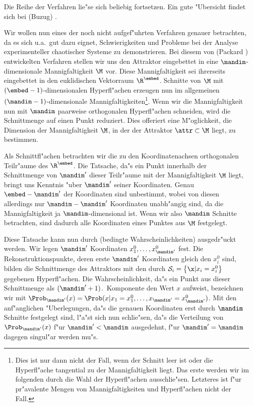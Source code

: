Die Reihe der Verfahren lie"se sich beliebig fortsetzen. Ein gute "Ubersicht
findet sich bei \autor(Buzug) \cite{Buzug94}. 

Wir wollen nun eines der noch nicht
aufgef"uhrten Verfahren genauer betrachten, da es sich u.a.\  gut dazu eignet,
Schwierigkeiten und Probleme bei der Analyse experimenteller chaotischer Systeme zu
demonstrieren. Bei diesem von \autor(Packard \etal) \cite{Packard80} entwickelten Verfahren stellen wir
uns den Attraktor eingebettet in eine $\mandim$-dimensionale Mannigfaltigkeit $\M$ vor.
Diese Mannigfaltigkeit sei ihrerseits eingebettet in den euklidischen Vektorraum
$\R^\embed$.  Schnitte von $\M$ mit $(\embed-1)$-di\-men\-sio\-nalen Hyperfl"achen
erzeugen nun im allgemeinen $(\mandim-1)$-dimensionale Mannigfaltigkeiten\footnote{Dies
  ist nur dann nicht der Fall, wenn der Schnitt leer ist oder die Hyperfl"ache tangential
  zu der Mannigfaltigkeit liegt.  Das erste werden wir im folgenden durch die Wahl der
  Hyperfl"achen ausschlie"sen. Letzteres ist f"ur pr"avalente Mengen von
  Mannigfaltigkeiten und Hyperfl"achen nicht der Fall.}.  Wenn wir die
Mannigfaltigkeit nun mit $\mandim$ paarweise orthogonalen Hyperfl"achen schneiden, wird
die Schnittmenge auf einen Punkt reduziert. Dies offeriert eine M"oglichkeit, die Dimension
der Mannigfaltigkeit $\M$, in der der Attraktor $\attr\subset\M$ liegt, zu bestimmen.

Als Schnittfl"achen betrachten wir die zu den Koordinatenachsen orthogonalen Teil\-r"aume
des $\R^\embed$. Die Tatsache, da"s ein Punkt innerhalb der Schnittmenge von $\mandim'$
dieser Teil\-r"aume mit der Mannigfaltigkeit $\M$ liegt, bringt uns Kenntnis "uber
$\mandim'$ seiner Koordinaten. Genau $\embed-\mandim'$ der Koordinaten sind unbestimmt,
wobei von diesen allerdings nur $\mandim-\mandim'$ Koordinaten unabh"angig sind, da die
Mannigfaltigkeit ja $\mandim$-dimensional ist. Wenn wir also $\mandim$ Schnitte
betrachten, sind dadurch alle Koordinaten eines Punktes aus $\M$ festgelegt.

Diese Tatsache kann nun durch \begriff(bedingte Wahrscheinlichkeiten) ausgedr"uckt werden.
Wir legen $\mandim'$ Koordinaten $x^0_1,\dots,x^0_{\mandim'}$ fest. Die
Rekonstruktionspunkte, deren erste $\mandim'$ Koordinaten gleich den $x^0_i$ sind, bilden
die Schnittmenge des Attraktors mit den durch $\mathcal{S}_i=\left\{ \x \vert
  x_i=x^0_i\right\}$ gegebenen Hyperfl"achen. Die Wahrscheinlichkeit, da"s ein Punkt aus
dieser Schnittmenge als $(\mandim'+1)$.\  Komponente den Wert $x$ aufweist, bezeichnen wir
mit $\Prob_{\mandim'}(x)=\Prob(x\vert x_1=x^0_1,\dots,x_{\mandim'}=x^0_{\mandim'})$. Mit
den anf"anglichen "Uberlegungen, da"s die genauen Koordinaten erst durch $\mandim$
Schnitte festgelegt sind, l"a"st sich nun schlie"sen, da"s die Verteilung von
$\Prob_{\mandim'}(x)$ f"ur $\mandim'<\mandim$ ausgedehnt, f"ur $\mandim'=\mandim$ dagegen
singul"ar werden mu"s.

